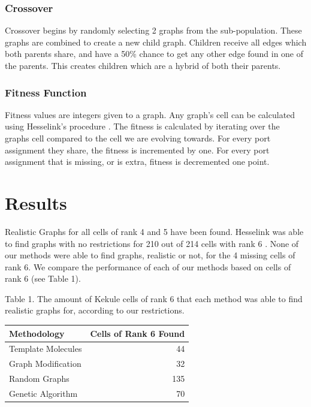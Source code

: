 \documentclass[12pt]{article}
\begin{document}
\subsubsection{Crossover}

Crossover begins by randomly selecting 2 graphs from the sub-population. These graphs are combined to create a new child graph. Children receive all edges which both parents share, and have a 50\% chance to get any other edge found in one of the parents. This creates children which are a hybrid of both their parents.

\subsubsection{Fitness Function}

Fitness values are integers given to a graph. Any graph's cell can be calculated using Hesselink's procedure \cite{H13}. The fitness is calculated by iterating over the graphs cell compared to the cell we are evolving towards. For every port assignment they share, the fitness is incremented by one. For every port assignment that is missing, or is extra, fitness is decremented one point. 

\section{Results}

Realistic Graphs for all cells of rank 4 and 5 have been found. Hesselink was able to find graphs with no restrictions for 210 out of 214 cells with rank 6 \cite{H13}. None of our methods were able to find graphs, realistic or not, for the 4 missing cells of rank 6. We compare the performance of each of our methods based on cells of rank 6 (see Table 1).

Table 1. The amount of Kekule cells of rank 6 that each method was able to find realistic graphs for, according to our restrictions.
\begin{center}
	
  \begin{tabular}{ | l | r |}
    \hline
    Methodology & Cells of Rank 6 Found \\
    \hline
    Template Molecules & 44 \\
    Graph Modification & 32 \\
    Random Graphs & 135 \\
    Genetic Algorithm & 70 \\
    \hline
  \end{tabular}
\end{center}
\end{document}
